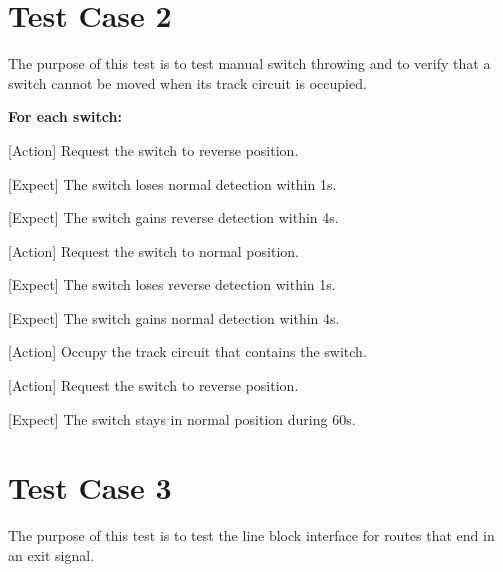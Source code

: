 \documentclass[10pt,a4paper]{article}
\begin{document}
\vspace{9mm}
\section{Test Case 2}
The purpose of this test is to test manual switch throwing and to verify that a switch cannot be moved when its track circuit is occupied.

\begin{procedurebox}
  \textbf{For each switch:}
  \begin{teststeps}
    \item \textnormal{[Action]} Request the switch to reverse position.
    \item \textnormal{[Expect]} The switch loses normal detection within 1s.
    \item \textnormal{[Expect]} The switch gains reverse detection within 4s.
    \item \textnormal{[Action]} Request the switch to normal position.
    \item \textnormal{[Expect]} The switch loses reverse detection within 1s.
    \item \textnormal{[Expect]} The switch gains normal detection within 4s.
    \item \textnormal{[Action]} Occupy the track circuit that contains the switch.
    \item \textnormal{[Action]} Request the switch to reverse position.
    \item \textnormal{[Expect]} The switch stays in normal position during 60s.
  \end{teststeps}
\end{procedurebox}

\vspace{9mm}
\section{Test Case 3}
The purpose of this test is to test the line block interface for routes that end in an exit signal.
\end{document}
